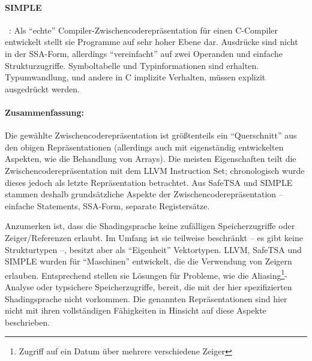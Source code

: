 \documentclass[twoside,a4paper,fleqn,12pt]{book}
\begin{document}

\paragraph{SIMPLE}~\cite{SIMPLE}: Als "`echte"' Compiler-Zwischencoderepräsentation für einen C-Compiler entwickelt
stellt sie Programme auf sehr hoher Ebene dar. Ausdrücke sind nicht in der SSA-Form, allerdings
"`vereinfacht"' auf zwei Operanden und einfache Strukturzugriffe. Symboltabelle und Typinformationen
sind erhalten. Typumwandlung, und andere in C implizite Verhalten, müssen explizit ausgedrückt werden.


\paragraph{Zusammenfassung:}
Die gewählte Zwischencoderepräsentation ist größtenteils ein "`Querschnitt"' aus den obigen Repräsentationen
(allerdings auch mit eigenständig entwickelten Aspekten, wie die Behandlung von Arrays).
Die meisten Eigenschaften
teilt die Zwischencoderepräsentation mit dem LLVM Instruction Set; chronologisch wurde dieses jedoch als letzte
Repräsentation betrachtet. Aus SafeTSA und SIMPLE stammen deshalb grundsätzliche Aspekte der Zwischencoderepräsentation 
-- einfache Statements, SSA-Form, separate Registersätze.

Anzumerken ist, dass die Shadingsprache keine zufälligen Speicherzugriffe oder Zeiger/Referenzen erlaubt.
Im Umfang ist sie teilweise beschränkt -- es gibt keine Strukturtypen --, besitzt aber als "`Eigenheit"' Vektortypen.
LLVM, SafeTSA und SIMPLE wurden für "`Maschinen"' entwickelt, die die Verwendung von Zeigern erlauben. Entsprechend
stellen sie Lösungen für Probleme, wie die Aliasing\footnote{Zugriff auf ein Datum über mehrere verschiedene Zeiger}-Analyse
oder typsichere Speicherzugriffe, bereit, die mit der hier spezifizierten Shadingsprache nicht vorkommen. Die genannten Repräsentationen sind hier nicht
mit ihren vollständigen Fähigkeiten in Hinsicht auf diese Aspekte beschrieben.
\end{document}
